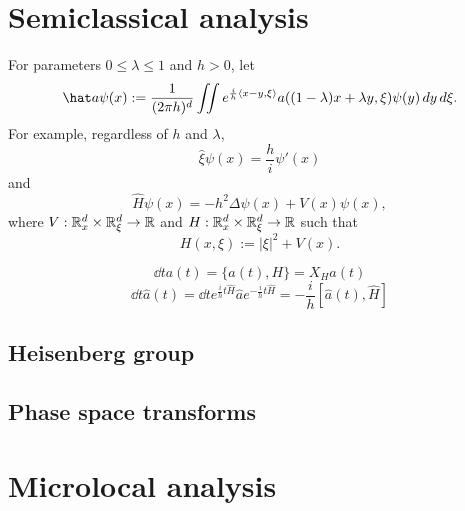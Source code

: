 \documentclass{../../large}
\begin{document}
\section{}


\begin{prb}
\end{prb}

\chapter{Semiclassical analysis}

For parameters $0\le\lambda\le1$ and $h>0$, let
\[\hat a\psi(x):=\frac1{(2\pi h)^d}\iint e^{\frac ih\<x-y,\xi\>}a((1-\lambda)x+\lambda y,\xi)\psi(y)\,dy\,d\xi.\]
For example, regardless of $h$ and $\lambda$,
\[\hat\xi\psi(x)=\frac hi\psi'(x)\]
and
\[\hat H\psi(x)=-h^2\Delta\psi(x)+V(x)\psi(x),\]
where $V:\mathbb{R}_x^d\times\mathbb{R}_\xi^d\to\mathbb{R}$ and $H:\mathbb{R}_x^d\times\mathbb{R}_\xi^d\to\mathbb{R}$ such that
\[H(x,\xi):=|\xi|^2+V(x).\]


\[\dd{t}a(t)=\{a(t),H\}=X_Ha(t)\]
\[\dd{t}\hat a(t)=\dd{t}e^{\frac iht\hat H}\hat ae^{-\frac iht\hat H}=-\frac ih[\hat a(t),\hat H]\]

\section{Heisenberg group}
\section{Phase space transforms}

\chapter{Microlocal analysis}
\end{document}
